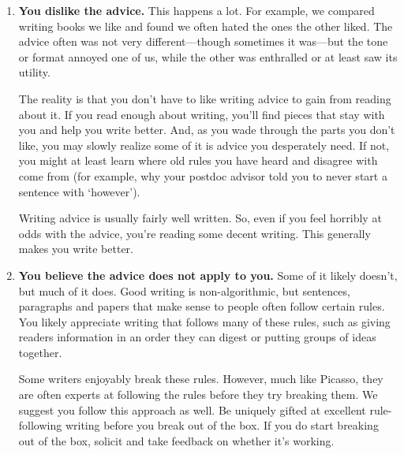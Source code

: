 \documentclass[11pt,letter]{article}
\begin{document}
\begin{enumerate}
\item {\bf You dislike the advice.} This happens a lot. For example, we compared writing books we like and found we often hated the ones the other liked. The advice often was not very different---though sometimes it was---but the tone or format annoyed one of us, while the other was enthralled or at least saw its utility. 

The reality is that you don't have to like writing advice to gain from reading about it. If you read enough about writing, you'll find pieces that stay with you and help you write better. And, as you wade through the parts you don't like, you may slowly realize some of it is advice you desperately need. If not, you might at least learn where old rules you have heard and disagree with come from (for example, why your postdoc advisor told you to never start a sentence with `however'). %

Writing advice is usually fairly well written. So, even if you feel horribly at odds with the advice, you're reading some decent writing. This generally makes you write better. 
\item {\bf You believe the advice does not apply to you.} Some of it likely doesn't, but much of it does. Good writing is non-algorithmic, but sentences, paragraphs and papers that make sense to people often follow certain rules. You likely appreciate writing that follows many of these rules, such as giving readers information in an order they can digest or putting groups of ideas together. 

Some writers enjoyably break these rules. However, much like Picasso, they are often experts at following the rules before they try breaking them. We suggest you follow this approach as well. Be uniquely gifted at excellent rule-following writing before you break out of the box. If you do start breaking out of the box, solicit and take feedback on whether it's working. 
\end{enumerate}
\end{document}
